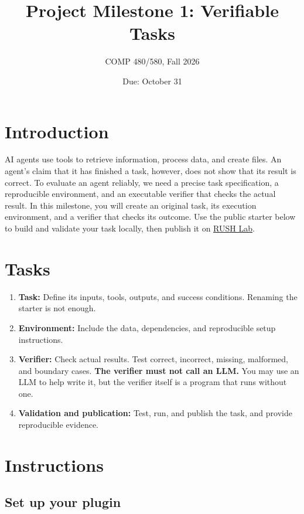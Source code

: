 \documentclass{article}
\title{Project Milestone 1: Verifiable Tasks}
\author{COMP 480/580, Fall 2026}
\date{Due: October 31}
\begin{document}
\maketitle

\section{Introduction}

AI agents use tools to retrieve information, process data, and create files.
An agent's claim that it has finished a task, however, does not show that its
result is correct. To evaluate an agent reliably, we need a precise task
specification, a reproducible environment, and an executable verifier that
checks the actual result. In this milestone, you will create an original task,
its execution environment, and a verifier that checks its outcome. Use the
public starter below to build and validate your task locally, then publish it
on \href{https://rush-lab.org}{RUSH Lab}.

\section{Tasks}

\begin{enumerate}
  \item \textbf{Task:} Define its inputs, tools, outputs, and success
    conditions. Renaming the starter is not enough.
  \item \textbf{Environment:} Include the data, dependencies, and reproducible
    setup instructions.
  \item \textbf{Verifier:} Check actual results. Test correct, incorrect,
    missing, malformed, and boundary cases. \textbf{The verifier must not call
    an LLM.} You may use an LLM to help write it, but the verifier itself is a
    program that runs without one.
  \item \textbf{Validation and publication:} Test, run, and publish the task,
    and provide reproducible evidence.
\end{enumerate}

\section{Instructions}

\subsection{Set up your plugin}
\end{document}
